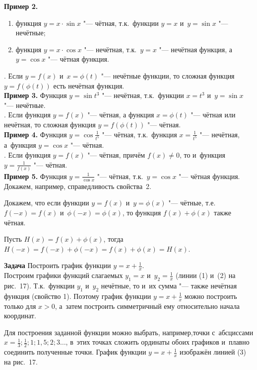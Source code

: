 \indent \textbf{Пример 2.}
\begin{enumerate}
\item функция $y = x \cdot \sin x$ "--- чётная, т.к.\ функции
$y = x$ и~$y = \sin x$ "--- нечётные;
\item функция $y = x \cdot \cos x$ "--- нечётная, т.к.\ $y = x$ "---
нечётная функция, а~$y = \cos x$ "--- чётная функция.
\end{enumerate}

. Если $y = f(x)$ и~$x = \phi(t)$ "--- нечётные функции, то сложная функция
$y = f(\phi(t))$ есть нечётная функция.\\

\indent \textbf{Пример 3.} Функция $y = \sin t^{3}$ "--- нечётная, т.к.\ функции
$x = t^{3}$ и~$y = \sin x$ "--- нечётные. \\

. Если функция $y = f(x)$ "--- чётная, а функция $x = \phi(t)$ "---
чётная или нечётная, то сложная функция $y = f(\phi(t))$ "--- чётная. \\

\indent \textbf{Пример 4.} Функция $\displaystyle y = \cos \frac{1}{t^{5}}$
"--- чётная, т.к.\ функция $\displaystyle x = \frac{1}{t^{5}}$
"--- нечётная, а~функция $y = \cos x$ "--- чётная. \\

. Если функция $y = f(x)$ "--- чётная, причём $f(x) \ne 0$, то
и~функция $y = \frac{1}{f(x)}$ "--- чётная. \\

\indent \textbf{Пример 5.} Функция $\displaystyle y = \frac{1}{\cos x}$
"--- чётная, т.к.\ $y = \cos x$ "--- чётная функция. \\

Докажем, например, справедливость свойства~2.

Докажем, что если функции $y = f(x)$ и~$y = \phi(x)$ "--- чётные, т.е.\
$f(-x) = f(x)$ и~$\phi(-x) = \phi(x)$, то функция $f(x) + \phi(x)$
также чётная.

Пусть $H(x) = f(x) + \phi(x)$, тогда
$H(-x) = f(-x) + \phi(-x) = f(x) + \phi(x) = H(x)$.

\textbf{Задача}
Построить график функции $\displaystyle y = x + \frac{1}{x}$. \\
Построим графики функций слагаемых $y_{1} = x$ и~$\displaystyle y_{2} = \frac{1}{x}$
(линии (1) и~(2) на рис.\ 17). Т.к.\ функции $y_{1}$ и~$y_{2}$ нечётные,
то и~их сумма "--- также нечётная функция (свойство 1).
Поэтому график функции $\displaystyle y = x + \frac{1}{x}$ можно
построить только для $x > 0$, а~затем построить симметричный ему
относительно начала координат.

Для построения заданной функции можно выбрать, например,точки с~абсциссами
$\displaystyle x = \frac{1}{3}; \frac{1}{2}; 1; 1{,}5; 2; 3 \dots$,
в~этих точках сложить ординаты обоих графиков и~плавно соединить
полученные точки. График функции $\displaystyle y = x + \frac{1}{x}$
изображён линией (3) на рис.\ 17.

